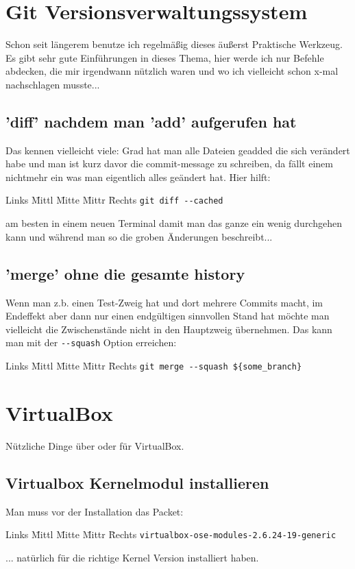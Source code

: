 \documentclass[12pt]{article}
\newenvironment{code}{\begin{tabbing}Links \= Mittl \= Mitte \= Mittr \= Rechts \kill}{\end{tabbing}}
\begin{document}
\section{Git Versionsverwaltungssystem}
Schon seit längerem benutze ich regelmäßig dieses äußerst Praktische Werkzeug.
Es gibt sehr gute Einführungen in dieses Thema, hier werde ich nur Befehle abdecken, die 
mir irgendwann nützlich waren und wo ich vielleicht schon x-mal nachschlagen musste...

\subsection{'diff' nachdem man 'add' aufgerufen hat}
Das kennen vielleicht viele: Grad hat man alle Dateien geadded die sich verändert habe und man
ist kurz davor die commit-message zu schreiben, da fällt einem nichtmehr ein was man eigentlich alles
geändert hat. Hier hilft:
\begin{code}
	\> \verb#git diff --cached#
\end{code}
am besten in einem neuen Terminal damit man das ganze ein wenig durchgehen kann und während man so
die groben Änderungen beschreibt...

\subsection{'merge' ohne die gesamte history}
Wenn man z.b. einen Test-Zweig hat und dort mehrere Commits macht, im Endeffekt aber 
dann nur einen endgültigen sinnvollen Stand hat möchte man vielleicht die Zwischenstände
nicht in den Hauptzweig übernehmen. Das kann man mit der \verb#--squash#
Option erreichen:
\begin{code}
	\> \verb#git merge --squash ${some_branch}#
\end{code}

\section{VirtualBox}
Nützliche Dinge über oder für VirtualBox.
\subsection{Virtualbox Kernelmodul installieren}
Man muss vor der Installation das Packet:
\begin{code}
  \> \verb#virtualbox-ose-modules-2.6.24-19-generic# 
\end{code}
... natürlich für die richtige Kernel Version installiert haben.
\end{document}
